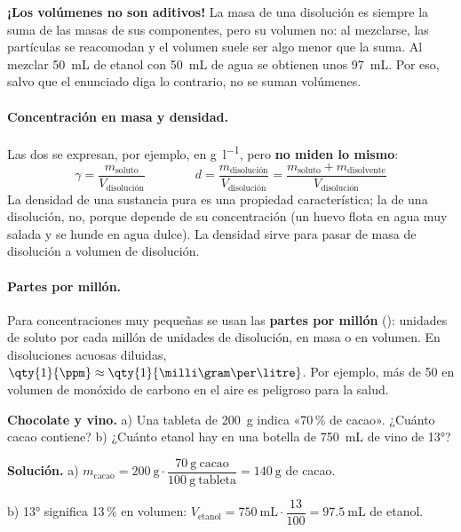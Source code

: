 \begin{remark}
    \textbf{¡Los volúmenes no son aditivos!} La masa de una disolución es siempre la suma de las masas de sus componentes, pero su
    volumen no: al mezclarse, las partículas se reacomodan y el volumen suele ser algo menor que la suma. Al mezclar \qty{50}{\mL}
    de etanol con \qty{50}{\mL} de agua se obtienen unos \qty{97}{\mL}. Por eso, salvo que el enunciado diga lo contrario, no se
    suman volúmenes.
\end{remark}

\paragraph{Concentración en masa y densidad.} Las dos se expresan, por ejemplo, en \unit{\gram\per\litre}, pero
\textbf{no miden lo mismo}:
\[ \gamma = \frac{m_{\text{soluto}}}{V_{\text{disolución}}} \qquad\qquad d = \frac{m_{\text{disolución}}}{V_{\text{disolución}}} = \frac{m_{\text{soluto}} + m_{\text{disolvente}}}{V_{\text{disolución}}} \]
La densidad de una sustancia pura es una propiedad característica; la de una disolución, no, porque depende de su concentración
(un huevo flota en agua muy salada y se hunde en agua dulce). La densidad sirve para pasar de masa de disolución a volumen de
disolución.

\paragraph{Partes por millón.} Para concentraciones muy pequeñas se usan las \textbf{partes por millón} (\unit{\ppm}): unidades
de soluto por cada millón de unidades de disolución, en masa o en volumen. En disoluciones acuosas diluidas,
\(\qty{1}{\ppm} \approx \qty{1}{\milli\gram\per\litre}\). Por ejemplo, más de \qty{50}{\ppm} en volumen de monóxido de carbono
en el aire es peligroso para la salud.

\begin{example}
    \textbf{Chocolate y vino.} a) Una tableta de \qty{200}{\gram} indica «70\,\% de cacao». ¿Cuánto cacao contiene?
    b) ¿Cuánto etanol hay en una botella de \qty{750}{\mL} de vino de \ang{13}?

    \textbf{Solución.} a) \(m_{\text{cacao}} = \qty{200}{\gram} \cdot \dfrac{\qty{70}{\gram}\ \text{cacao}}{\qty{100}{\gram}\ \text{tableta}} = \qty{140}{\gram}\) de cacao.

    b) \ang{13} significa 13\,\% en volumen: \(V_{\text{etanol}} = \qty{750}{\mL} \cdot \dfrac{13}{100} = \qty{97.5}{\mL}\) de etanol.
\end{example}

